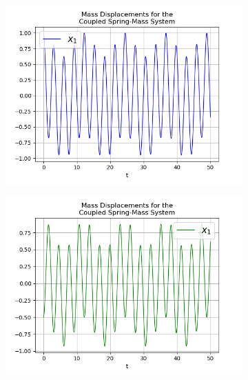 \documentclass{article}
\begin{document}
\begin{figure}[h!]
  \centering
  \begin{subfigure}[b]{0.32\linewidth}
    \includegraphics[width=\linewidth]{two_springs311.png}
     \caption{}
  \end{subfigure}
  \begin{subfigure}[b]{0.32\linewidth}
    \includegraphics[width=\linewidth]{two_springs312.png}
    \caption{}
  \end{subfigure}
  \begin{subfigure}[b]{0.32\linewidth}

\end{subfigure}
\end{figure}
\end{document}
